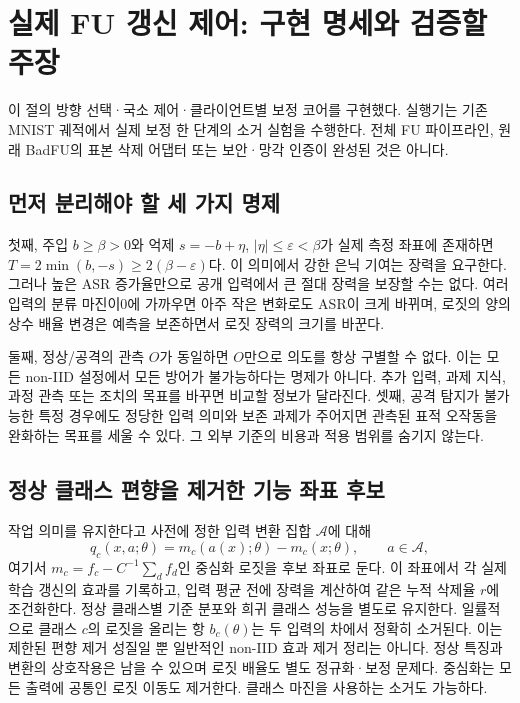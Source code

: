 \documentclass[10pt,a4paper]{article}
\begin{document}
\section{실제 FU 갱신 제어: 구현 명세와 검증할 주장}
이 절의 방향 선택·국소 제어·클라이언트별 보정 코어를 구현했다.
실행기는 기존 MNIST 궤적에서 실제 보정 한 단계의 소거 실험을 수행한다.
전체 FU 파이프라인, 원래 BadFU의 표본 삭제 어댑터 또는 보안·망각 인증이 완성된 것은 아니다.

\subsection{먼저 분리해야 할 세 가지 명제}
첫째, 주입 $b\ge\beta>0$와 억제 $s=-b+\eta$, $|\eta|\le\varepsilon<\beta$가
실제 측정 좌표에 존재하면 $T=2\min(b,-s)\ge2(\beta-\varepsilon)$다.
이 의미에서 강한 은닉 기여는 장력을 요구한다.
그러나 높은 ASR 증가율만으로 공개 입력에서 큰 절대 장력을 보장할 수는 없다.
여러 입력의 분류 마진이0에 가까우면 아주 작은 변화로도 ASR이 크게 바뀌며,
로짓의 양의 상수 배율 변경은 예측을 보존하면서 로짓 장력의 크기를 바꾼다.

둘째, 정상/공격의 관측 $O$가 동일하면 $O$만으로 의도를 항상 구별할 수 없다.
이는 모든 non-IID 설정에서 모든 방어가 불가능하다는 명제가 아니다.
추가 입력, 과제 지식, 과정 관측 또는 조치의 목표를 바꾸면 비교할 정보가 달라진다.
셋째, 공격 탐지가 불가능한 특정 경우에도 정당한 입력 의미와 보존 과제가 주어지면
관측된 표적 오작동을 완화하는 목표를 세울 수 있다. 그 외부 기준의 비용과 적용 범위를 숨기지 않는다.

\subsection{정상 클래스 편향을 제거한 기능 좌표 후보}
작업 의미를 유지한다고 사전에 정한 입력 변환 집합 $\mathcal A$에 대해
\begin{equation}\label{eq:paired-coordinate}
 q_c(x,a;\theta)=m_c(a(x);\theta)-m_c(x;\theta),\qquad a\in\mathcal A,
\end{equation}
여기서 $m_c=f_c-C^{-1}\sum_df_d$인 중심화 로짓을 후보 좌표로 둔다.
이 좌표에서 각 실제 학습 갱신의 효과를 기록하고,
입력 평균 전에 장력을 계산하여 같은 누적 삭제율 $r$에 조건화한다.
정상 클래스별 기준 분포와 희귀 클래스 성능을 별도로 유지한다.
일률적으로 클래스 $c$의 로짓을 올리는 항 $b_c(\theta)$는 두 입력의 차에서 정확히 소거된다.
이는 제한된 편향 제거 성질일 뿐 일반적인 non-IID 효과 제거 정리는 아니다.
정상 특징과 변환의 상호작용은 남을 수 있으며 로짓 배율도 별도 정규화·보정 문제다.
중심화는 모든 출력에 공통인 로짓 이동도 제거한다. 클래스 마진을 사용하는 소거도 가능하다.
\end{document}
